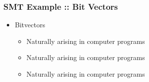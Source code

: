 
\begin{frame}

\frametitle{SMT Example :: Bit Vectors}

\begin{itemize}

\item<1-> Bitvectors

\begin{itemize}

\item Naturally arising in computer programs 

\item Naturally arising in computer programs 

\item Naturally arising in computer programs 

\end{itemize}

\end{itemize}

\end{frame}
